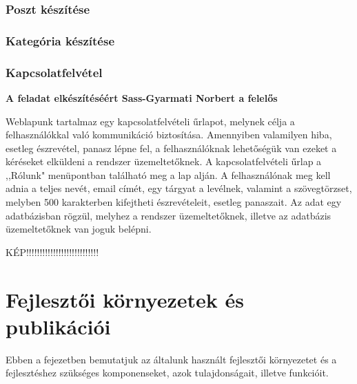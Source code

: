 \documentclass[
]{thesis-ekf}
\theoremstyle{definition}
\theoremstyle{remark}
\begin{document}
		\subsection{Poszt készítése}
		\subsection{Kategória készítése}
		\subsection{Kapcsolatfelvétel}
			\par \textbf{A feladat elkészítéséért Sass-Gyarmati Norbert a felelős}
			\par Weblapunk tartalmaz egy kapcsolatfelvételi űrlapot, melynek célja a felhasználókkal való kommunikáció biztosítása. Amennyiben valamilyen hiba, esetleg észrevétel, panasz lépne fel, a felhasználóknak lehetőségük van ezeket a kéréseket elküldeni a rendszer üzemeltetőknek. A kapcsolatfelvételi űrlap a ,,Rólunk" menüpontban található meg a lap alján. A felhasználónak meg kell adnia a teljes nevét, email címét, egy tárgyat a levélnek, valamint a szövegtörzset, melyben 500 karakterben kifejtheti észrevételeit, esetleg panaszait. Az adat egy adatbázisban rögzül, melyhez a rendszer üzemeltetőknek, illetve az adatbázis üzemeltetőknek van joguk belépni.
			\par KÉP!!!!!!!!!!!!!!!!!!!!!!!!!!!

\chapter{Fejlesztői környezetek és publikációi}
	\par Ebben a fejezetben bemutatjuk az általunk használt fejlesztői környezetet és a fejlesztéshez szükséges komponenseket, azok tulajdonságait, illetve funkcióit.
\end{document}
